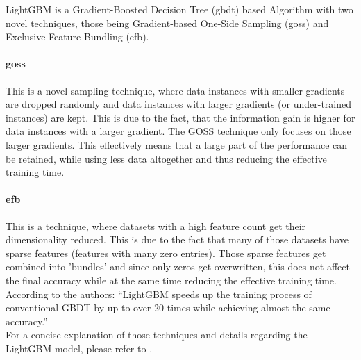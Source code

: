 LightGBM is a Gradient-Boosted Decision Tree (\gls{gbdt}) based Algorithm with two novel techniques, those being Gradient-based One-Side Sampling (\gls{goss}) and Exclusive Feature Bundling (\gls{efb}).

\paragraph{\gls{goss}}This is a novel sampling technique, where data instances with smaller gradients are dropped randomly and data instances with larger gradients (or under-trained instances) are kept. This is due to the fact, that the information gain is higher for data instances with a larger gradient. The GOSS technique only focuses on those larger gradients. This effectively means that a large part of the performance can be retained, while using less data altogether and thus reducing the effective training time.

\paragraph{\gls{efb}}This is a technique, where datasets with a high feature count get their dimensionality reduced. This is due to the fact that many of those datasets have sparse features (features with many zero entries). Those sparse features get combined into 'bundles' and since only zeros get overwritten, this does not affect the final accuracy while at the same time reducing the effective training time.\\

\noindent According to the authors: ``LightGBM speeds up the
training process of conventional GBDT by up to over 20 times while achieving almost the same accuracy.'' \parencite[p.~1]{NIPS2017_6449f44a}\\

\noindent For a concise explanation of those techniques and details regarding the LightGBM model, please refer to \cite{NIPS2017_6449f44a}.